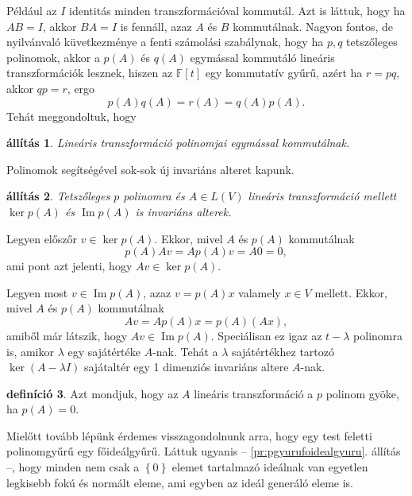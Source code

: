 \documentclass[9pt, a4paper, showtrims]{memoir}
\makeatletter
\renewenvironment{proof}[1][\proofname]
    {\par\pushQED{\qed}%
    \normalfont \topsep6\p@\@plus6\p@\relax
    \trivlist
    \item[\hskip\labelsep
        \itshape
    #1\@addpunct{:}]\ignorespaces}
    {\popQED\endtrivlist\@endpefalse}
\theoremstyle{plain}
\newtheorem{proposition}{állítás}[chapter]
\theoremstyle{remark}
\theoremstyle{definition}
\newtheorem{definition}[proposition]{definíció}
\DeclareMathOperator{\im}{Im}
\makeatother
\begin{document}
    Például az $I$ identitás minden transzformációval kommutál.
    Azt is láttuk, hogy ha $AB=I$, akkor $BA=I$ is fennáll, azaz $A$ és $B$ kommutálnak.
    Nagyon fontos, de nyilvánvaló küvetkezménye a fenti számolási szabálynak,
    hogy ha $p,q$ tetszőleges polinomok, akkor a $p\left( A \right)$ és $q\left( A \right)$ egymással kommutáló lineáris transzformációk lesznek, hiszen az 
    $\mathbb{F}\left[ t \right]$ egy kommutatív gyűrű, 
    azért ha $r=pq$, akkor $qp=r$,
    ergo 
    \[
        p\left( A \right)q\left( A \right)=r\left( A \right)=q\left( A \right)p\left( A \right).
    \]
    Tehát meggondoltuk, hogy
    \begin{proposition}
        Lineáris transzformáció polinomjai egymással kommutálnak.
    \end{proposition}
    Polinomok segítségével sok-sok új invariáns alteret kapunk.
    \begin{proposition}
        Tetszőleges $p$ polinomra és $A\in L\left( V \right)$ 
        lineáris transzformáció mellett 
        $\ker p\left( A \right)$ és $\im p\left( A \right)$ is invariáns alterek.
    \end{proposition}
    \begin{proof}
        Legyen előszőr $v\in\ker p\left( A \right)$.
        Ekkor, mivel $A$ és $p\left( A \right)$ kommutálnak
        \[
            p\left( A \right)Av=Ap\left( A \right)v=A0=0,
        \]
        ami pont azt jelenti, hogy $Av\in\ker p\left( A \right)$.

        Legyen most $v\in\im p\left( A \right)$,
        azaz
        $v=p\left( A \right)x$ valamely $x\in V$ mellett.
        Ekkor, mivel $A$ és $p\left( A \right)$ kommutálnak
        \[
            Av=Ap\left( A \right)x=p\left( A \right)\left( Ax \right),
        \]
        amiből már látszik, hogy $Av\in\im p\left( A \right)$.
    \end{proof}
    Speciálisan ez igaz az $t-\lambda$ polinomra is, 
    amikor $\lambda$
    egy sajátértéke $A$-nak. Tehát a $\lambda$ sajátértékhez tartozó 
    $\ker \left( A-\lambda I \right)$ sajátaltér egy 1 dimenziós invariáns altere
    $A$-nak.
    \begin{definition}
        Azt mondjuk, hogy az $A$ lineáris transzformáció a $p$ polinom gyöke,
        ha $p\left( A \right)=0$.
    \end{definition}
    Mielőtt tovább lépünk érdemes visszagondolnunk arra,
    hogy egy test feletti polinomgyűrű egy főideálgyűrű.
    Láttuk ugyanis 
    -- \ref{pr:pgyurufoidealgyuru}. állítás --, 
    hogy minden nem csak a $\left\{ 0 \right\}$ elemet tartalmazó ideálnak 
    van egyetlen legkisebb fokú és normált eleme, 
    ami egyben az ideál generáló eleme is.
\end{document}
